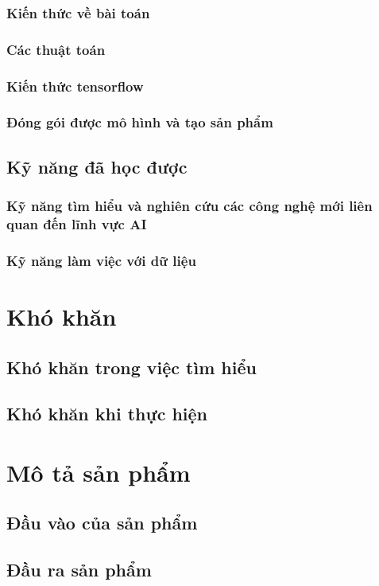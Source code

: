 \documentclass{article}
\begin{document}
\subsubsection{Kiến thức về bài toán}
\subsubsection{Các thuật toán}
\subsubsection{Kiến thức tensorflow}
\subsubsection{Đóng gói được mô hình và tạo sản phẩm}

\subsection{Kỹ năng đã học được}
\subsubsection{Kỹ năng tìm hiểu và nghiên cứu các công nghệ mới liên quan đến lĩnh vực AI}
\subsubsection{Kỹ năng làm việc với dữ liệu}

\section{Khó khăn}
\subsection{Khó khăn trong việc tìm hiểu}
\subsection{Khó khăn khi thực hiện}

\section{Mô tả sản phẩm}
\subsection{Đầu vào của sản phẩm}
\subsection{Đầu ra sản phẩm}
\end{document}
